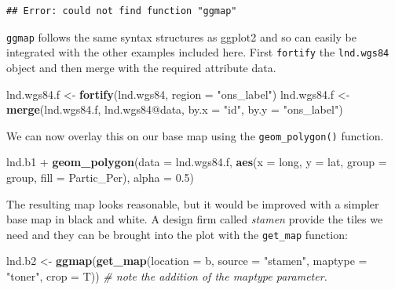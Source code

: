 \documentclass[]{article}
\newenvironment{Shaded}{}{}
\newcommand{\KeywordTok}[1]{\textcolor[rgb]{0.00,0.44,0.13}{\textbf{{#1}}}}
\newcommand{\DataTypeTok}[1]{\textcolor[rgb]{0.56,0.13,0.00}{{#1}}}
\newcommand{\FloatTok}[1]{\textcolor[rgb]{0.25,0.63,0.44}{{#1}}}
\newcommand{\StringTok}[1]{\textcolor[rgb]{0.25,0.44,0.63}{{#1}}}
\newcommand{\CommentTok}[1]{\textcolor[rgb]{0.38,0.63,0.69}{\textit{{#1}}}}
\newcommand{\NormalTok}[1]{{#1}}
\begin{document}
\begin{verbatim}
## Error: could not find function "ggmap"
\end{verbatim}

\texttt{ggmap} follows the same syntax structures as ggplot2 and so can
easily be integrated with the other examples included here. First
\texttt{fortify} the \texttt{lnd.wgs84} object and then merge with the
required attribute data.

\begin{Shaded}
\begin{Highlighting}[]
\NormalTok{lnd.wgs84.f <-}\StringTok{ }\KeywordTok{fortify}\NormalTok{(lnd.wgs84, }\DataTypeTok{region =} \StringTok{"ons_label"}\NormalTok{)}
\NormalTok{lnd.wgs84.f <-}\StringTok{ }\KeywordTok{merge}\NormalTok{(lnd.wgs84.f, lnd.wgs84@data, }\DataTypeTok{by.x =} \StringTok{"id"}\NormalTok{, }\DataTypeTok{by.y =} \StringTok{"ons_label"}\NormalTok{)}
\end{Highlighting}
\end{Shaded}

We can now overlay this on our base map using the
\texttt{geom\_polygon()} function.

\begin{Shaded}
\begin{Highlighting}[]
\NormalTok{lnd.b1 +}\StringTok{ }\KeywordTok{geom_polygon}\NormalTok{(}\DataTypeTok{data =} \NormalTok{lnd.wgs84.f, }\KeywordTok{aes}\NormalTok{(}\DataTypeTok{x =} \NormalTok{long, }\DataTypeTok{y =} \NormalTok{lat, }\DataTypeTok{group =} \NormalTok{group, }
    \DataTypeTok{fill =} \NormalTok{Partic_Per), }\DataTypeTok{alpha =} \FloatTok{0.5}\NormalTok{)}
\end{Highlighting}
\end{Shaded}

The resulting map looks reasonable, but it would be improved with a
simpler base map in black and white. A design firm called \emph{stamen}
provide the tiles we need and they can be brought into the plot with the
\texttt{get\_map} function:

\begin{Shaded}
\begin{Highlighting}[]
\NormalTok{lnd.b2 <-}\StringTok{ }\KeywordTok{ggmap}\NormalTok{(}\KeywordTok{get_map}\NormalTok{(}\DataTypeTok{location =} \NormalTok{b, }\DataTypeTok{source =} \StringTok{"stamen"}\NormalTok{, }\DataTypeTok{maptype =} \StringTok{"toner"}\NormalTok{, }
    \DataTypeTok{crop =} \NormalTok{T))  }\CommentTok{# note the addition of the maptype parameter.}
\end{Highlighting}
\end{Shaded}
\end{document}
